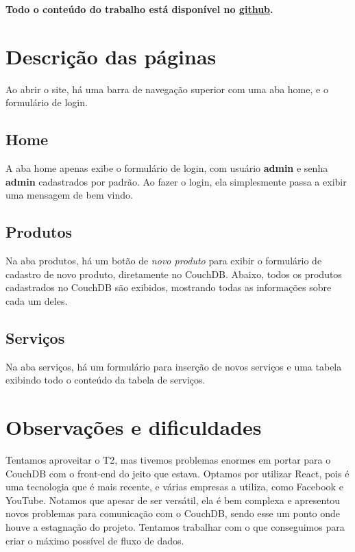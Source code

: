 \documentclass[10pt,a4paper]{article}
\begin{document}
\textbf{Todo o conteúdo do trabalho está disponível no \href{https://github.com/Adams123/Web2017}{github}.}
\section{Descrição das páginas}
Ao abrir o site, há uma barra de navegação superior com uma aba home, e o formulário de login.
\subsection{Home}
A aba home apenas exibe o formulário de login, com usuário \textbf{admin} e senha \textbf{admin} cadastrados por padrão. Ao fazer o login, ela simplesmente passa a exibir uma mensagem de bem vindo.
\subsection{Produtos}
Na aba produtos, há um botão de \textit{novo produto} para exibir o formulário de cadastro de novo produto, diretamente no CouchDB. Abaixo, todos os produtos cadastrados no CouchDB são exibidos, mostrando todas as informações sobre cada um deles.
\subsection{Serviços}
Na aba serviços, há um formulário para inserção de novos serviços e uma tabela exibindo todo o conteúdo da tabela de serviços.
\section{Observações e dificuldades}
Tentamos aproveitar o T2, mas tivemos problemas enormes em portar para o CouchDB com o front-end do jeito que estava. Optamos por utilizar React, pois é uma tecnologia que é mais recente, e várias empresas a utiliza, como Facebook e YouTube. Notamos que apesar de ser versátil, ela é bem complexa e apresentou novos problemas para comunicação com o CouchDB, sendo esse um ponto onde houve a estagnação do projeto. Tentamos trabalhar com o que conseguimos para criar o máximo possível de fluxo de dados.
\end{document}

